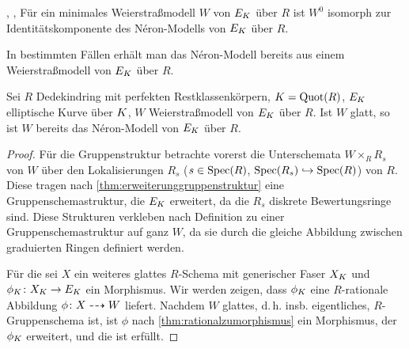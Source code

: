 \documentclass[german]{scrreprt}
\begin{document}
\begin{Bemerkung}
  \cite[Chapter 1.5, S.\,23]{neron},
  \cite[Corollary IV.9.1]{silverman2},
  \cite[S. 46]{tate}
  Für ein minimales Weierstraßmodell $W$ von $E_{K}$ über $R$
  ist $W^0$ isomorph zur Identitätskomponente des Néron-Modells von
  $E_{K}$ über $R$.
\end{Bemerkung}


In bestimmten Fällen erhält man das Néron-Modell bereits aus einem
Weierstraßmodell von $E_{K}$ über $R$.
\begin{Korollar}\label{thm:neronmausweierstrassgl}
  Sei $R$ Dedekindring mit perfekten Restklassenkörpern, $K=\operatorname{Quot}(R)$,
  $E_{K}$ elliptische Kurve über $K$, $W$ Weierstraßmodell von $E_{K}$
  über $R$.
  Ist $W$ glatt, so ist $W$ bereits das Néron-Modell von $E_{K}$ über
  $R$.
  \begin{proof}
    Für die Gruppenstruktur betrachte vorerst die Unterschemata
    $W\times_R R_s$ von $W$ über den Lokalisierungen
    $R_s$ ($s\in\operatorname{Spec}(R)$, $\operatorname{Spec}(R_s)\hookrightarrow\operatorname{Spec}(R)$) von $R$.
    Diese tragen nach \autoref{thm:erweiterunggruppenstruktur} eine
    Gruppenschemastruktur, die $E_{K}$ erweitert, da die $R_s$ diskrete
    Bewertungsringe sind.
    Diese Strukturen verkleben nach Definition zu einer
    Gruppenschemastruktur auf ganz $W$, da sie durch die gleiche
    Abbildung zwischen graduierten Ringen definiert werden.

    Für die \NAbbEig sei $X$ ein weiteres glattes $R$-Schema mit
    generischer Faser $X_{K}$ und $\phi_{K}\colon X_{K}\to E_{K}$ ein
    Morphismus.
    Wir werden zeigen, dass $\phi_{K}$ eine $R$-rationale Abbildung
    $\phi\colon X\dashrightarrow W$ liefert.
    Nachdem $W$ glattes, d.\,h. insb. eigentliches, $R$-Gruppenschema
    ist, ist $\phi$ nach \autoref{thm:rationalzumorphismus} ein
    Morphismus, der $\phi_{K}$ erweitert, und die \NAbbEig ist erfüllt.
    

\end{proof}
\end{Korollar}
\end{document}

